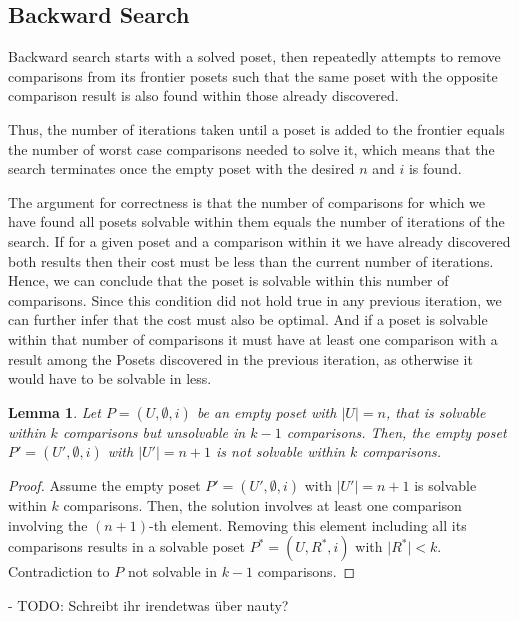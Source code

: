 \documentclass[10pt,journal,compsoc]{IEEEtran}
\newtheorem{lemma}{Lemma}
\begin{document}
\subsection{Backward Search}

Backward search starts with a solved poset, then repeatedly attempts to remove comparisons from its
frontier posets such that the same poset with the opposite comparison result is also found within
those already discovered.

Thus, the number of iterations taken until a poset is added to the frontier equals the number of
worst case comparisons needed to solve it, which means that the search terminates once the empty
poset with the desired $n$ and $i$ is found.

The argument for correctness is that the number of comparisons for which we have found all posets solvable within them equals the number of iterations of the search.
If for a given poset and a comparison within it we have already discovered both results then their cost must be less than the current number of iterations. Hence, we can conclude that the poset is solvable within this number of comparisons.
Since this condition did not hold true in any previous iteration, we can further infer that the cost must also be optimal. 
And if a poset is solvable within
that number of comparisons it must have at least one comparison with a result among the Posets
discovered in the previous iteration, as otherwise it would have to be solvable in less.

\begin{lemma}
Let $P=(U,\emptyset,i)$ be an empty poset with $\vert U \vert = n$, that is solvable within $k$ comparisons but unsolvable in $k-1$ comparisons.
Then, the empty poset $P'=(U',\emptyset,i)$ with $\vert U'\vert = n+1$ is not solvable within $k$ comparisons.
\end{lemma}
\begin{proof}
Assume the empty poset $P'=(U',\emptyset,i)$ with $\vert U' \vert = n+1$ is solvable within $k$ comparisons. Then, the solution involves at least one comparison involving the $(n+1)$-th element. Removing this element including all its comparisons results in a solvable poset $P^{*}=(U,R^{*},i)$ with $\vert R^{*}\vert < k$. Contradiction to $P$ not solvable in $k-1$ comparisons.
\end{proof}
- TODO: Schreibt ihr irendetwas über nauty?
\end{document}
